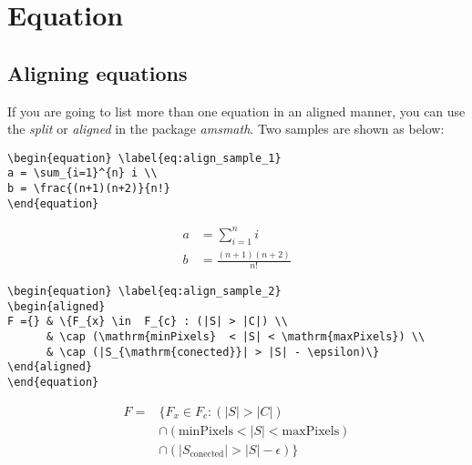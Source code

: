 \section{Equation}

\subsection{Aligning equations}

If you are going to list more than one equation in an aligned manner, you can use the \emph{split} or \emph{aligned} in the package \emph{amsmath}. Two samples are shown as below:

\begin{lstlisting}
\begin{equation} \label{eq:align_sample_1}
a = \sum_{i=1}^{n} i \\
b = \frac{(n+1)(n+2)}{n!}
\end{equation}
\end{lstlisting}

\begin{equation} \label{eq:align_sample_1}
\begin{split}
a &= \sum_{i=1}^{n} i \\
b &= \frac{(n+1)(n+2)}{n!}
\end{split}
\end{equation}

\begin{lstlisting}
\begin{equation} \label{eq:align_sample_2}
\begin{aligned}
F ={} & \{F_{x} \in  F_{c} : (|S| > |C|) \\
      & \cap (\mathrm{minPixels}  < |S| < \mathrm{maxPixels}) \\
      & \cap (|S_{\mathrm{conected}}| > |S| - \epsilon)\}
\end{aligned}
\end{equation}
\end{lstlisting}


\begin{equation} \label{eq:align_sample_2}
\begin{aligned}
F ={} & \{F_{x} \in  F_{c} : (|S| > |C|) \\
      & \cap (\mathrm{minPixels}  < |S| < \mathrm{maxPixels}) \\
      & \cap (|S_{\mathrm{conected}}| > |S| - \epsilon)\}
\end{aligned}
\end{equation}